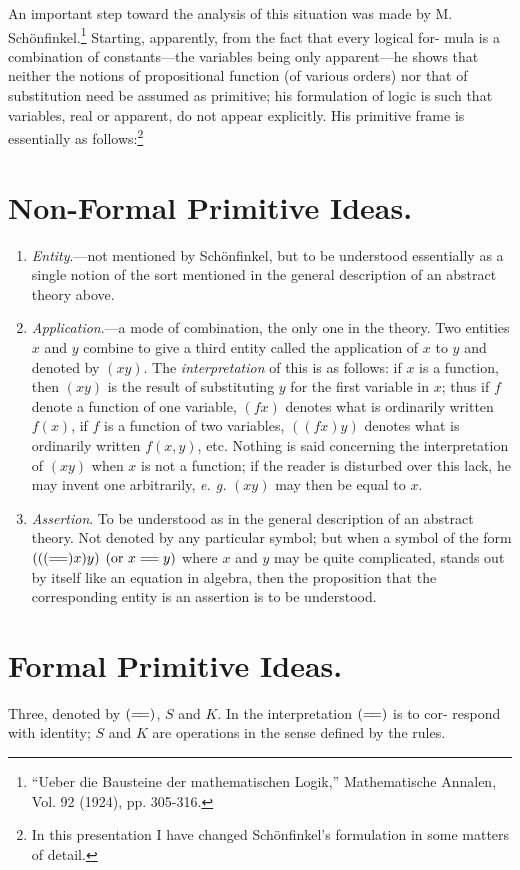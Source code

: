 \documentclass[9pt, twoside]{extarticle}
\newcommand{\td}[2][] {\todo[tickmarkheight=3pt, inline, size=\tiny, #1]{#2}}
\newcommand\litem[1]{\item{\textit{#1}.}}
\newcommand\longeq{=\joinrel=}
\begin{document}
An important step toward the analysis of this situation was made by
M. Schönfinkel.\footnote{``Ueber die Bausteine der mathematischen Logik,'' Mathematische Annalen, Vol. 92 (1924), pp. 305-316.} Starting, apparently, from the fact that every logical for-
mula is a combination of constants---the variables being only apparent---he
shows that neither the notions of propositional function (of various orders)
nor that of substitution need be assumed as primitive; his formulation of
logic is such that variables, real or apparent, do not appear explicitly. His primitive frame is essentially as follows:\footnote{In this presentation I have changed Schönfinkel's formulation in some matters of detail.}

\section{Non-Formal Primitive Ideas.}
\td{remove period in litem?}
\begin{enumerate}[label=\arabic*.,font=\itshape,wide]
\litem{Entity}---not mentioned by Schönfinkel, but to be understood
essentially as a single notion of the sort mentioned in the general description
of an abstract theory above.

\litem{Application}---a mode of combination, the only one in the theory.
Two entities \(x\) and \(y\) combine to give a third entity called the application of
\(x\) to \(y\) and denoted by \((xy)\). The \textit{interpretation} of this is as follows: if \(x\) is a function,
then \((xy)\) is the result of substituting \(y\) for the first variable in \(x\);
thus if \(f\) denote a function of one variable, \((fx)\) denotes what is ordinarily
written \(f(x)\), if \(f\) is a function of two variables, \(((fx) y)\) denotes what is
ordinarily written \(f(x, y)\), etc. Nothing is said concerning the interpretation
of \((xy)\) when \(x\) is not a function; if the reader is disturbed over this lack,
he may invent one arbitrarily, \textit{e. g.} \((xy)\) may then be equal to \(x\).

\litem{Assertion} To be understood as in the general description of an
abstract theory. Not denoted by any particular symbol; but when a symbol
of the form \((((\longeq)x)y)\) \((\text{or } x \longeq y)\) where \(x\) and \(y\) may be quite complicated,
stands out by itself like an equation in algebra, then the proposition that the
corresponding entity is an assertion is to be understood.
\end{enumerate}

\section{Formal Primitive Ideas.}
Three, denoted by \((\longeq)\), \(S\) and \(K\). In the interpretation \((\longeq)\) is to cor-
respond with identity; \(S\) and \(K\) are operations in the sense defined by the
rules.
\end{document}
